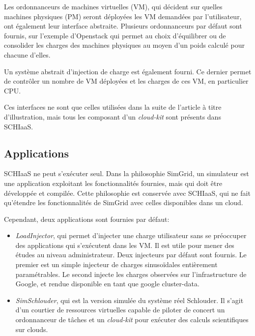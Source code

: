 \documentclass[parallelisme]{compas2017}
\begin{document}
Les ordonnanceurs de machines virtuelles (VM), qui décident sur quelles machines
physiques  (PM)  seront  déployées  les  VM  demandées  par  l'utilisateur,  ont
également  leur interface  abstraite.  Plusieurs ordonnanceurs  par défaut  sont
fournis,  sur l'exemple  d'Openstack  qui  permet au  choix  d'équilibrer ou  de
consolider les charges  des machines physiques au moyen d'un  poids calculé pour
chacune d'elles.

Un  système abstrait  d'injection de  charge  est également  fourni. Ce  dernier
permet de  contrôler un  nombre de  VM déployées et  les charges  de ces  VM, en
particulier  CPU.   

Ces interfaces ne sont  que celles utilisées dans la suite  de l'article à titre
d'illustration, mais tous les composant d'un \textit{cloud-kit} sont présents
dans SCHIaaS.  

\subsection{Applications}

SCHIaaS ne peut s'exécuter seul. Dans  la philosophie SimGrid, un simulateur est
une  application exploitant  les fonctionnalités  fournies, mais  qui doit  être
développée et  compilée.  Cette philosophie  est conservée avec SCHIaaS,  qui ne
fait qu'étendre les  fonctionnalités de SimGrid avec celles  disponibles dans un
cloud.

Cependant, deux applications sont fournies par défaut: 
\begin{itemize}
\item \emph{LoadInjector}, qui permet d'injecter  une charge utilisateur sans se
  préoccuper des  applications qui s'exécutent  dans les  VM. Il est  utile pour
  mener des études au niveau administrateur.
  Deux injecteurs  par défaut  sont  fournis. Le  premier est  un  simple 
injecteur  de charges sinusoïdales  entièrement paramétrables.  Le second 
injecte  les charges observées  sur  l'infrastructure  de  Google,   et  rendue 
 disponible  en tant que google cluster-data\cite{gcd}.
\item  \emph{SimSchlouder},  qui   est  la  version  simulée   du  système  réel
  Schlouder\cite{Michon2017}.  Il s'agit d'un  courtier de ressources virtuelles
  capable   de  piloter   de   concert   un  ordonnanceur   de   tâches  et   un
  \textit{cloud-kit}  pour  exécuter  des   calculs  scientifiques  sur  clouds.
\end{itemize}
\end{document}
